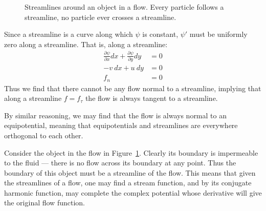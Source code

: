 \documentclass[letterpaper, twoside, 12 pt]{article}
\begin{document}
\begin{figure}[H]
		\captionsetup{width = 0.5 \textwidth}
		\caption{
			Streamlines around an object in a flow.
			Every particle follows a streamline, no particle ever crosses a streamline.
		}
		\label{fig:streamlines}
	\end{figure}

	Since a streamline is a curve along which $\psi$ is constant, $\psi'$ must be uniformly zero along a streamline.
	That is, along a streamline:
	\begin{align*}
		\frac{\partial \psi}{\partial x}dx + \frac{\partial \psi}{\partial y}dy &= 0 \\
		-v\> dx  + u\> dy &= 0 \\
		f_n &= 0
	\end{align*}
	Thus we find that there cannot be any flow normal to a streamline, implying that along a streamline $f = f_\tau$ the flow is always tangent to a streamline.

	By similar reasoning, we may find that the flow is always normal to an equipotential, meaning that equipotentials and streamlines are everywhere orthogonal to each other.

	Consider the object in the flow in Figure~\ref{fig:streamlines}.
	Clearly its boundary is impermeable to the fluid --- there is no flow across its boundary at any point.
	Thus the boundary of this object must be a streamline of the flow.
	This means that given the streamlines of a flow, one may find a stream function, and by its conjugate harmonic function, may complete the complex potential whose derivative will give the original flow function.
\end{document}
